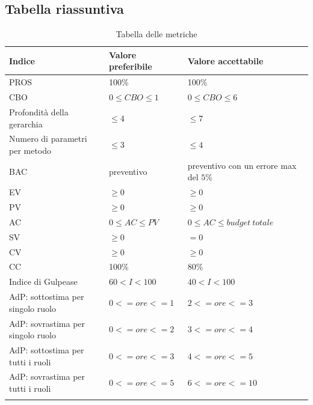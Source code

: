 	\subsection{Tabella riassuntiva}	
		\begin{center}
		\begin{longtable}{|C{5cm}|C{5cm}|C{5cm}|}
			\hline
			\textbf{Indice} & \textbf{Valore preferibile} & \textbf{Valore accettabile}  \\ 
						
			\hline
			\endhead
			
			\hline
			PROS & 100\% & 100\% \\
			\hline
			CBO & $0 \leq CBO \leq 1$ & $0 \leq CBO \leq 6$ \\
			\hline
			Profondità della gerarchia & $\leq 4$ & $\leq 7$ \\
			\hline
			Numero di parametri per metodo & $\leq 3$ & $\leq 4$ \\
			\hline
			BAC & preventivo & preventivo con un errore max del $5\%$ \\
			\hline
			EV & $\geq 0$ & $\geq 0$ \\
			\hline
			PV & $\geq 0$ & $\geq 0$ \\			
			\hline
			AC & $0 \leq AC \le PV$ & $0 \leq AC \leq budget \ totale$ \\			
			\hline
			SV & $\ge 0$ & $= 0$ \\			
			\hline
			CV & $\ge 0$ & $\geq 0$ \\		
			\hline
			CC & 100\% & 80\% \\
			\hline
			Indice di Gulpease & $60 < I < 100$ & $40 < I < 100$ \\
			\hline
			AdP: sottostima per singolo ruolo &  $0 <= ore <= 1$ & $2 <= ore <= 3$ \\
			\hline
			AdP: sovrastima per singolo ruolo & $0 <= ore <= 2$ & $3 <= ore <= 4$ \\
			\hline
			AdP: sottostima per tutti i ruoli & $ 0 <= ore <= 3 $ & $ 4 <= ore <= 5 $ \\
			\hline
			AdP: sovrastima per tutti i ruoli & $0 <= ore <= 5$ & $ 6 <= ore <= 10 $ \\
			\hline

			
				
			\hiderowcolors
			\caption{Tabella delle metriche}		
		\end{longtable}	
	\end{center}
	
